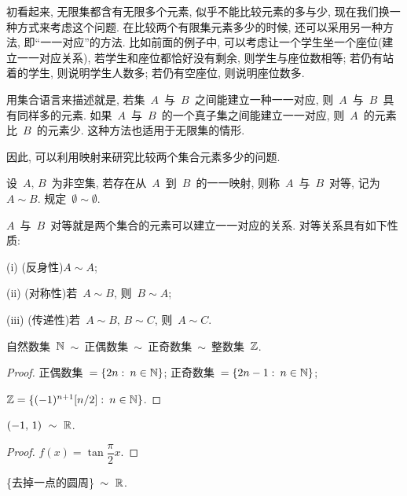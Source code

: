 初看起来, 无限集都含有无限多个元素, 似乎不能比较元素的多与少, 现在我们换一种方式来考虑这个问题. 在比较两个有限集元素多少的时候, 还可以采用另一种方法, 即``一一对应''的方法. 比如前面的例子中, 可以考虑让一个学生坐一个座位(建立一一对应关系), 若学生和座位都恰好没有剩余, 则学生与座位数相等; 若仍有站着的学生, 则说明学生人数多; 若仍有空座位, 则说明座位数多.

用集合语言来描述就是, 若集~$A$~与~$B$~之间能建立一种一一对应, 则~$A$~与~$B$~具有同样多的元素. 如果~$A$~与~$B$~的一个真子集之间能建立一一对应, 则~$A$~的元素比~$B$~的元素少. 这种方法也适用于无限集的情形.

因此, 可以利用映射来研究比较两个集合元素多少的问题.

\begin{definition}
设~$A, \, B$~为非空集, 若存在从~$A$~到~$B$~的一一映射, 则称~$A$~与~$B$~对等,
记为~$A \sim B$. 规定~$\emptyset \sim \emptyset$.
\end{definition}

$A$~与~$B$~对等就是两个集合的元素可以建立一一对应的关系. 对等关系具有如下性质:

(i) (反身性)$A \sim A$;

(ii) (对称性)若~$A \sim B$, 则~$B \sim A$;

(iii) (传递性)若~$A \sim B, \, B \sim C$, 则~$A \sim C$.

\medskip

\begin{example} \label{ex1.2.1}
自然数集~$\mathbb{N}$~$\sim$~正偶数集~$\sim$~正奇数集~$\sim$~整数集~$\mathbb{Z}$.
\end{example}

\begin{proof}
正偶数集~$= \{2n: \: n \in \mathbb{N}\}$; \quad 正奇数集~$= \{2n-1: \: n \in \mathbb{N}\}$;

\qquad \quad $\mathbb{Z} = \{(-1)^{n+1} [n/2]: \: n \in \mathbb{N}\}$.
\end{proof}

\medskip

\begin{example} \label{ex1.2.2}
$(-1, \, 1)~\sim~\mathbb{R}$.
\end{example}

\begin{proof}
$f(x) = \tan \dfrac{\pi}{2}x$.
\end{proof}

\medskip

\begin{example} \label{ex1.2.3}
\{去掉一点的圆周\}~$\sim~\mathbb{R}$.
\end{example}

